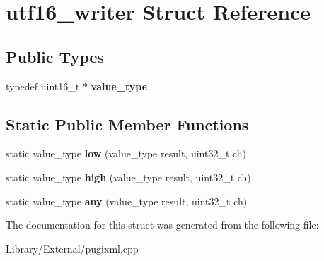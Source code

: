 \hypertarget{structutf16__writer}{}\section{utf16\+\_\+writer Struct Reference}
\label{structutf16__writer}
\subsection*{Public Types}
\begin{DoxyCompactItemize}
\item 
\hypertarget{structutf16__writer_a527b705eaf5099167b8bc42423ce918c}{}typedef uint16\+\_\+t $\ast$ {\bfseries value\+\_\+type}\label{structutf16__writer_a527b705eaf5099167b8bc42423ce918c}

\end{DoxyCompactItemize}
\subsection*{Static Public Member Functions}
\begin{DoxyCompactItemize}
\item 
\hypertarget{structutf16__writer_ab11fef721a8b38de5e315d2e75d12956}{}static value\+\_\+type {\bfseries low} (value\+\_\+type result, uint32\+\_\+t ch)\label{structutf16__writer_ab11fef721a8b38de5e315d2e75d12956}

\item 
\hypertarget{structutf16__writer_a01b6ce1a567dea11daead3ca83f42d5c}{}static value\+\_\+type {\bfseries high} (value\+\_\+type result, uint32\+\_\+t ch)\label{structutf16__writer_a01b6ce1a567dea11daead3ca83f42d5c}

\item 
\hypertarget{structutf16__writer_ac14e06db126fbbef4be7efdb80fbdf4a}{}static value\+\_\+type {\bfseries any} (value\+\_\+type result, uint32\+\_\+t ch)\label{structutf16__writer_ac14e06db126fbbef4be7efdb80fbdf4a}

\end{DoxyCompactItemize}


The documentation for this struct was generated from the following file\+:\begin{DoxyCompactItemize}
\item 
Library/\+External/pugixml.\+cpp\end{DoxyCompactItemize}
